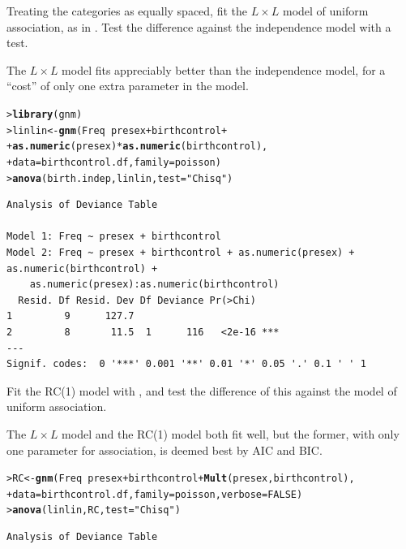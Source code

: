 \documentclass[10pt]{report}\usepackage[]{graphicx}\usepackage[]{color}
\makeatletter
\newcommand{\hlnum}[1]{\textcolor[rgb]{0.686,0.059,0.569}{#1}}%
\newcommand{\hlstr}[1]{\textcolor[rgb]{0.192,0.494,0.8}{#1}}%
\newcommand{\hlopt}[1]{\textcolor[rgb]{0,0,0}{#1}}%
\newcommand{\hlstd}[1]{\textcolor[rgb]{0.345,0.345,0.345}{#1}}%
\newcommand{\hlkwb}[1]{\textcolor[rgb]{0.69,0.353,0.396}{#1}}%
\newcommand{\hlkwc}[1]{\textcolor[rgb]{0.333,0.667,0.333}{#1}}%
\newcommand{\hlkwd}[1]{\textcolor[rgb]{0.737,0.353,0.396}{\textbf{#1}}}%
\newenvironment{kframe}{%
 \def\at@end@of@kframe{}%
 \ifinner\ifhmode%
  \def\at@end@of@kframe{\end{minipage}}%
  \begin{minipage}{\columnwidth}%
 \fi\fi%
 \def\FrameCommand##1{\hskip\@totalleftmargin \hskip-\fboxsep
 \colorbox{shadecolor}{##1}\hskip-\fboxsep
     \hskip-\linewidth \hskip-\@totalleftmargin \hskip\columnwidth}%
 \MakeFramed {\advance\hsize-\width
   \@totalleftmargin\z@ \linewidth\hsize
   \@setminipage}}%
 {\par\unskip\endMakeFramed%
 \at@end@of@kframe}
\newenvironment{knitrout}{}{} %
\renewenvironment{knitrout}{\small\renewcommand{\baselinestretch}{.85}}{} %
\makeatother
\begin{document}
\begin{Exercises}
\begin{enumerate*}
    \item Treating the categories as equally spaced, fit the $L \times L$ model
    of uniform association, as in .  Test the
    difference against the independence model with a \LR test.
    \begin{ans}
    The $L \times L$ model fits appreciably better than the independence model, for a ``cost'' of
    only one extra parameter in the model.
\begin{knitrout}\footnotesize
{}\color{fgcolor}\begin{kframe}
\begin{alltt}
\hlstd{> }\hlkwd{library}\hlstd{(gnm)}
\hlstd{> }\hlstd{linlin} \hlkwb{<-} \hlkwd{gnm}\hlstd{(Freq} \hlopt{~} \hlstd{presex} \hlopt{+} \hlstd{birthcontrol} \hlopt{+}
\hlstd{+ }                     \hlkwd{as.numeric}\hlstd{(presex)} \hlopt{*} \hlkwd{as.numeric}\hlstd{(birthcontrol),}
\hlstd{+ }              \hlkwc{data}\hlstd{=birthcontrol.df,} \hlkwc{family}\hlstd{=poisson)}
\hlstd{> }\hlkwd{anova}\hlstd{(birth.indep, linlin,} \hlkwc{test}\hlstd{=}\hlstr{"Chisq"}\hlstd{)}
\end{alltt}
\begin{verbatim}
Analysis of Deviance Table

Model 1: Freq ~ presex + birthcontrol
Model 2: Freq ~ presex + birthcontrol + as.numeric(presex) + as.numeric(birthcontrol) + 
    as.numeric(presex):as.numeric(birthcontrol)
  Resid. Df Resid. Dev Df Deviance Pr(>Chi)    
1         9      127.7                         
2         8       11.5  1      116   <2e-16 ***
---
Signif. codes:  0 '***' 0.001 '**' 0.01 '*' 0.05 '.' 0.1 ' ' 1
\end{verbatim}
\end{kframe}
\end{knitrout}
    \end{ans}
    
    \item Fit the RC(1) model with , and test the difference of
    this against the model of uniform association.
    \begin{ans}
    The $L \times L$ model and the RC(1) model both fit well, but the
    former, with only one parameter for association, is deemed best
    by AIC and BIC.
\begin{knitrout}\footnotesize
{}\color{fgcolor}\begin{kframe}
\begin{alltt}
\hlstd{> }\hlstd{RC} \hlkwb{<-} \hlkwd{gnm}\hlstd{(Freq} \hlopt{~} \hlstd{presex} \hlopt{+} \hlstd{birthcontrol} \hlopt{+} \hlkwd{Mult}\hlstd{(presex, birthcontrol),}
\hlstd{+ }          \hlkwc{data}\hlstd{=birthcontrol.df,} \hlkwc{family}\hlstd{=poisson,} \hlkwc{verbose}\hlstd{=}\hlnum{FALSE}\hlstd{)}
\hlstd{> }\hlkwd{anova}\hlstd{(linlin, RC,} \hlkwc{test}\hlstd{=}\hlstr{"Chisq"}\hlstd{)}
\end{alltt}
\begin{verbatim}
Analysis of Deviance Table


\end{verbatim}
\end{kframe}
\end{knitrout}
\end{ans}
\end{enumerate*}
\end{Exercises}
\end{document}
